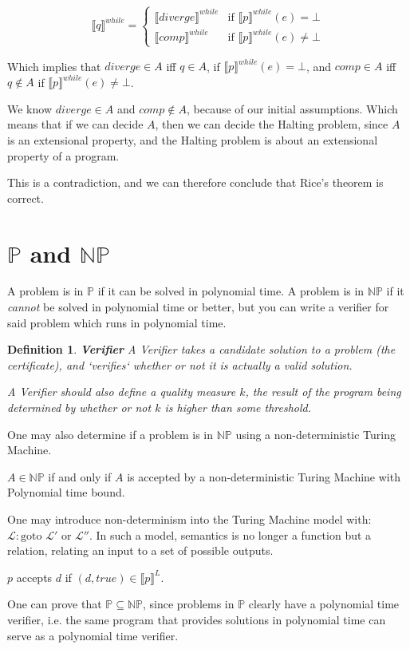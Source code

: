 \documentclass[a4paper, final]{article}
\newcommand{\p}{\mathbb{P}}
\newcommand{\np}{\mathbb{NP}}
\newtheorem{definition}{Definition}
\begin{document}
\begin{equation}
	\llbracket q \rrbracket^{while}=\begin{cases}
		\llbracket diverge \rrbracket^{while} & \textrm{if }\llbracket p \rrbracket^{while}(e)=\bot     \\
		\llbracket comp \rrbracket^{while}    & \textrm{if } \llbracket p \rrbracket^{while}(e)\neq\bot
	\end{cases}
\end{equation}

Which implies that $diverge\in A$ iff $q\in A$, if $\llbracket p \rrbracket^{while}(e)=\bot$,
and $comp\in A$ iff $q\notin A$ if $\llbracket p \rrbracket^{while}(e)\neq\bot$.

We know $diverge\in A$ and $comp\notin A$, because of our initial assumptions. Which means that if
we can decide $A$, then we can decide the Halting problem, since $A$ is an extensional property,
and the Halting problem is about an extensional property of a program.

This is a contradiction, and we can therefore conclude that Rice's theorem is correct.

\section{$\mathbb{P}$ and $\mathbb{NP}$}
A problem is in $\mathbb P$ if it can be solved in polynomial time. A problem is in $\mathbb{NP}$
if it \textit{cannot} be solved in polynomial time or better, but you can write a verifier for said problem
which runs in polynomial time.

\begin{definition}
	\textbf{Verifier}
	A Verifier takes a candidate solution to a problem (the certificate), and
	`verifies` whether or not it is actually a valid solution.

	A Verifier should also define a quality measure $k$, the result of the program
	being determined by whether or not $k$ is higher than some threshold.
\end{definition}

One may also determine if a problem is in $\np$ using a non-deterministic Turing Machine.

$A\in\np$ if and only if $A$ is accepted by a non-deterministic Turing Machine with Polynomial time bound.

One may introduce non-determinism into the Turing Machine model with:
$\mathcal{L}:\textrm{goto }\mathcal{L}'\textrm{ or }\mathcal{L}''$. In such a model, semantics is no longer
a function but a relation, relating an input to a set of possible outputs.

$p$ accepts $d$ if $(d, true)\in\llbracket p \rrbracket ^L$.

One can prove that $\p\subseteq\np$, since problems in $\p$ clearly have a polynomial time verifier,
i.e. the same program that provides solutions in polynomial time can serve as a polynomial time verifier.
\end{document}
